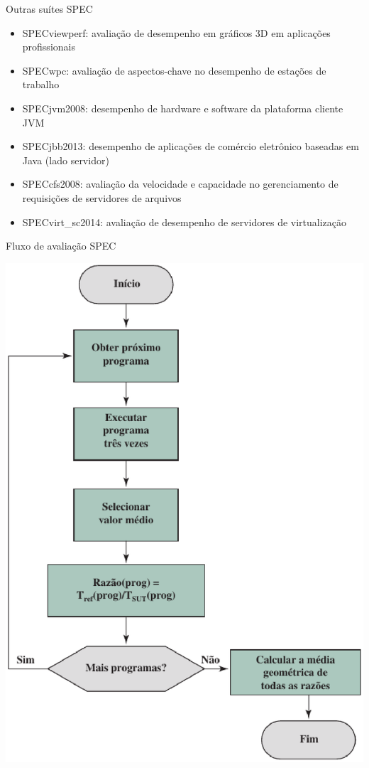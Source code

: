 \begin{slide}{Outras suítes SPEC}
\begin{itemize}
	\item SPECviewperf: avaliação de desempenho em gráficos 3D em aplicações profissionais
	\item SPECwpc: avaliação de aspectos-chave no desempenho de estações de trabalho
	\item SPECjvm2008: desempenho de hardware e software da plataforma cliente JVM
      \item SPECjbb2013: desempenho de aplicações de comércio eletrônico baseadas em Java (lado servidor)
      \item SPECcfs2008: avaliação da velocidade e capacidade no gerenciamento de requisições de servidores de arquivos
      \item SPECvirt\_sc2014: avaliação de desempenho de servidores de virtualização
\end{itemize}
\end{slide}

\begin{slide}{Fluxo de avaliação SPEC}
	\begin{center}
		\includegraphics[height = 0.8\textheight]{figs/fluxo-spec}
	\end{center}
\end{slide}

